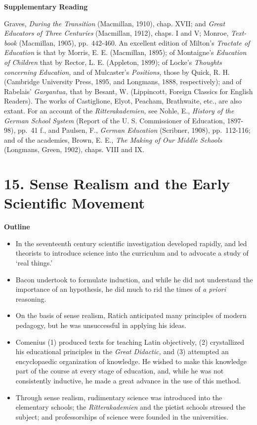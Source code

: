 \documentclass[]{book}
\providecommand{\tightlist}{%
  \setlength{\itemsep}{0pt}\setlength{\parskip}{0pt}}
\begin{document}
\textbf{Supplementary Reading}

Graves, \emph{During the Transition} (Macmillan, 1910), chap. XVII; and \emph{Great Educators of Three Centuries} (Macmillan, 1912), chaps. I and V; Monroe, \emph{Text-book} (Macmillan, 1905), pp.~442-460. An excellent edition of Milton's \emph{Tractate of Education} is that by Morris, E. E. (Macmillan, 1895); of Montaigne's \emph{Education of Children} that by Rector, L. E. (Appleton, 1899); of Locke's \emph{Thoughts concerning Education,} and of Mulcaster's \emph{Positions,} those by Quick, R. H. (Cambridge University Press, 1895, and Longmans, 1888, respectively); and of Rabelais' \emph{Gargantua,} that by Besant, W. (Lippincott, Foreign Classics for English Readers). The works of Castiglione, Elyot, Peacham, Brathwaite, etc., are also extant. For an account of the \emph{Ritterakademien,} see Nohle, E., \emph{History of the German School System} (Report of the U. S. Commissioner of Education, 1897-98), pp.~41 f., and Paulsen, F., \emph{German Education} (Scribner, 1908), pp.~112-116; and of the academies, Brown, E. E., \emph{The Making of Our Middle Schools} (Longmans, Green, 1902), chaps. VIII and IX.

\hypertarget{sense-realism-and-the-early-scientific-movement}{%
\chapter{15. Sense Realism and the Early Scientific Movement}\label{sense-realism-and-the-early-scientific-movement}}

\textbf{Outline}

\begin{itemize}
\tightlist
\item
  In the seventeenth century scientific investigation developed rapidly, and led theorists to introduce science into the curriculum and to advocate a study of `real things.'
\item
  Bacon undertook to formulate induction, and while he did not understand the importance of an hypothesis, he did much to rid the times of \emph{a priori} reasoning.
\item
  On the basis of sense realism, Ratich anticipated many principles of modern pedagogy, but he was unsuccessful in applying his ideas.
\item
  Comenius (1) produced texts for teaching Latin objectively, (2) crystallized his educational principles in the \emph{Great Didactic,} and (3) attempted an encyclopaedic organization of knowledge. He wished to make this knowledge part of the course at every stage of education, and, while he was not consistently inductive, he made a great advance in the use of this method.
\item
  Through sense realism, rudimentary science was introduced into the elementary schools; the \emph{Ritterakademien} and the pietist schools stressed the subject; and professorships of science were founded in the universities.
\end{itemize}
\end{document}
